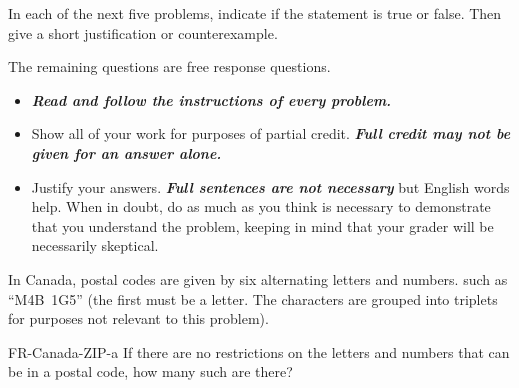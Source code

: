 \documentclass[letterpaper]{ngeexam}
\begin{document}
{\AMCcleardoublepage
\begin{instructions}
In each of the next five problems, indicate if the statement is true or false.
Then give a short justification or counterexample.
\end{instructions}


\AMCcleardoublepage

\begin{instructions}\noindent
The remaining questions are free response questions.
\begin{itemize}
\item \textbf{\emph{Read and follow the instructions of every problem.}}  
\item Show all of your work for purposes of partial credit.  
\textbf{\emph{Full credit may not be given for an answer alone.  }}
\item Justify your answers.  \textbf{\emph{Full sentences are not necessary}} but English words help.
When in doubt, do as much as you think is necessary to demonstrate
that you understand the problem, keeping in mind that your grader will
be necessarily skeptical.  
\end{itemize}
\end{instructions}
\bigskip
\begin{instructions}
In Canada, postal codes are given by six alternating letters and numbers.
such as ``M4B~1G5'' (the first must be a letter.  The characters are grouped into triplets for purposes not relevant to this problem).
\end{instructions}

\begin{question}{FR-Canada-ZIP-a}
    If there are no restrictions on the  letters and numbers that can be in a postal code, how many such are there?
\end{question}

}
\end{document}

